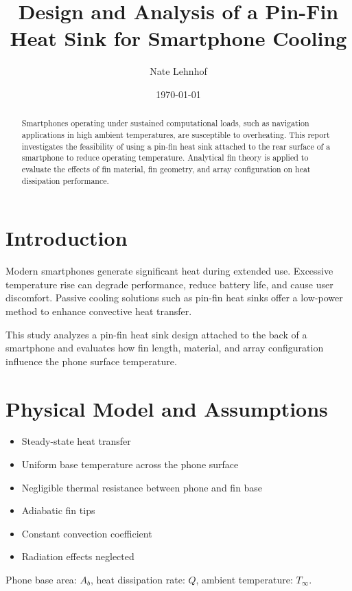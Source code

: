 \documentclass[12pt]{article}
\title{Design and Analysis of a Pin-Fin Heat Sink for Smartphone Cooling}
\author{Nate Lehnhof}
\date{\today}
\begin{document}
\maketitle

\begin{abstract}
Smartphones operating under sustained computational loads, such as navigation
applications in high ambient temperatures, are susceptible to overheating.
This report investigates the feasibility of using a pin-fin heat sink attached
to the rear surface of a smartphone to reduce operating temperature. Analytical
fin theory is applied to evaluate the effects of fin material, fin geometry, and
array configuration on heat dissipation performance.
\end{abstract}

\section{Introduction}

Modern smartphones generate significant heat during extended use. Excessive temperature
rise can degrade performance, reduce battery life, and cause user discomfort.
Passive cooling solutions such as pin-fin heat sinks offer a low-power method
to enhance convective heat transfer.

This study analyzes a pin-fin heat sink design attached to the back of a smartphone
and evaluates how fin length, material, and array configuration influence the phone
surface temperature.

\section{Physical Model and Assumptions}

\begin{itemize}
    \item Steady-state heat transfer
    \item Uniform base temperature across the phone surface
    \item Negligible thermal resistance between phone and fin base
    \item Adiabatic fin tips
    \item Constant convection coefficient
    \item Radiation effects neglected
\end{itemize}

Phone base area: $A_b$, heat dissipation rate: $Q$, ambient temperature: $T_\infty$.
\end{document}
